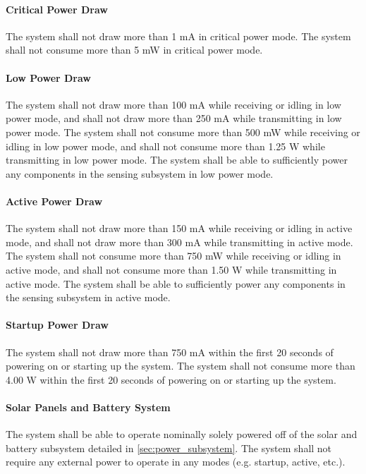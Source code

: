 \paragraph{Critical Power Draw} The system shall not draw more than 1 mA in
critical power mode. The system shall not consume more than 5 mW in critical
power mode.

\paragraph{Low Power Draw} The system shall not draw more than 100 mA while
receiving or idling in low power mode, and shall not draw more than 250
mA while transmitting in low power mode. The system shall not consume more
than 500 mW while receiving or idling in low power mode, and shall not
consume more than 1.25 W while transmitting in low power mode. The system
shall be able to sufficiently power any components in the sensing subsystem in
low power mode.

\paragraph{Active Power Draw} The system shall not draw more than 150 mA while
receiving or idling in active mode, and shall not draw more than 300
mA while transmitting in active mode. The system shall not consume more
than 750 mW while receiving or idling in active mode, and shall not
consume more than 1.50 W while transmitting in active mode. The system
shall be able to sufficiently power any components in the sensing subsystem in
active mode.

\paragraph{Startup Power Draw} The system shall not draw more than 750 mA
within the first 20 seconds of powering on or starting up the system. The
system shall not consume more than 4.00 W within the first 20 seconds of
powering on or starting up the system.

\paragraph{Solar Panels and Battery System} The system shall be able to
operate nominally solely powered off of the solar and battery subsystem
detailed in \autoref{sec:power_subsystem}. The system shall not require any
external power to operate in any modes (e.g. startup, active, etc.).

